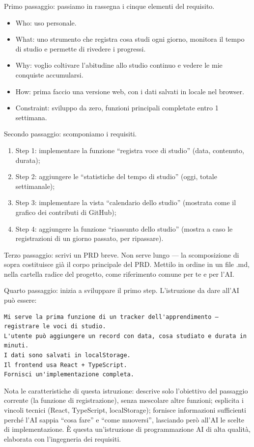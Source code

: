 Primo passaggio: passiamo in rassegna i cinque elementi del requisito.

\begin{itemize}
  \item Who: uso personale.
  \item What: uno strumento che registra cosa studi ogni giorno, monitora il tempo di studio e permette di rivedere i progressi.
  \item Why: voglio coltivare l'abitudine allo studio continuo e vedere le mie conquiste accumularsi.
  \item How: prima faccio una versione web, con i dati salvati in locale nel browser.
  \item Constraint: sviluppo da zero, funzioni principali completate entro 1 settimana.
\end{itemize}

Secondo passaggio: scomponiamo i requisiti.

\begin{enumerate}
  \item Step 1: implementare la funzione “registra voce di studio” (data, contenuto, durata);
  \item Step 2: aggiungere le “statistiche del tempo di studio” (oggi, totale settimanale);
  \item Step 3: implementare la vista “calendario dello studio” (mostrata come il grafico dei contributi di GitHub);
  \item Step 4: aggiungere la funzione “riassunto dello studio” (mostra a caso le registrazioni di un giorno passato, per ripassare).
\end{enumerate}

Terzo passaggio: scrivi un PRD breve. Non serve lungo — la scomposizione di sopra costituisce già il corpo principale del PRD. Mettilo in ordine in un file .md, nella cartella radice del progetto, come riferimento comune per te e per l'AI.

Quarto passaggio: inizia a sviluppare il primo step. L'istruzione da dare all'AI può essere:

\begin{lstlisting}
Mi serve la prima funzione di un tracker dell'apprendimento — registrare le voci di studio.
L'utente può aggiungere un record con data, cosa studiato e durata in minuti.
I dati sono salvati in localStorage.
Il frontend usa React + TypeScript.
Fornisci un'implementazione completa.
\end{lstlisting}

Nota le caratteristiche di questa istruzione: descrive solo l'obiettivo del passaggio corrente (la funzione di registrazione), senza mescolare altre funzioni; esplicita i vincoli tecnici (React, TypeScript, localStorage); fornisce informazioni sufficienti perché l'AI sappia “cosa fare” e “come muoversi”, lasciando però all'AI le scelte di implementazione. È questa un'istruzione di programmazione AI di alta qualità, elaborata con l'ingegneria dei requisiti.

